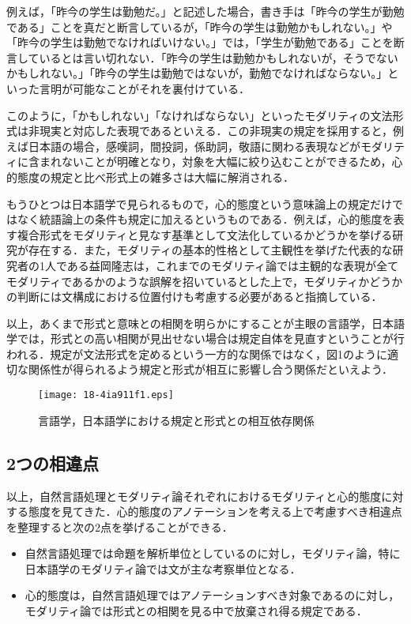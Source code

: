 \documentclass[japanese]{jnlp_1.4}
\begin{document}
例えば，「昨今の学生は勤勉だ。」と記述した場合，書き手は「昨今の学生が勤勉である」ことを真だと断言しているが，「昨今の学生は勤勉かもしれない。」や「昨今の学生は勤勉でなければいけない。」では，「学生が勤勉である」ことを断言しているとは言い切れない．「昨今の学生は勤勉かもしれないが，そうでないかもしれない。」「昨今の学生は勤勉ではないが，勤勉でなければならない。」といった言明が可能なことがそれを裏付けている．

このように，「かもしれない」「なければならない」といったモダリティの文法形式は非現実と対応した表現であるといえる．この非現実の規定を採用すると，例えば日本語の場合，感嘆詞，間投詞，係助詞，敬語に関わる表現などがモダリティに含まれないことが明確となり，対象を大幅に絞り込むことができるため，心的態度の規定と比べ形式上の雑多さは大幅に解消される．

もうひとつは日本語学で見られるもので，心的態度という意味論上の規定だけではなく統語論上の条件も規定に加えるというものである．例えば，心的態度を表す複合形式をモダリティと見なす基準として文法化しているかどうかを挙げる研究が存在する\cite{Article_05}．また，モダリティの基本的性格として主観性を挙げた代表的な研究者の1人である益岡隆志は，これまでのモダリティ論では主観的な表現が全てモダリティであるかのような誤解を招いているとした上で，モダリティかどうかの判断には文構成における位置付けも考慮する必要があると指摘している\cite{Book_08}．

以上，あくまで形式と意味との相関を明らかにすることが主眼の言語学，日本語学では，形式との高い相関が見出せない場合は規定自体を見直すということが行われる．規定が文法形式を定めるという一方的な関係ではなく，図1のように適切な関係性が得られるよう規定と形式が相互に影響し合う関係だといえよう．

\begin{figure}[t]
 \begin{center}
  \texttt{[image: 18-4ia911f1.eps]}
 \end{center}
 \caption{言語学，日本語学における規定と形式との相互依存関係}
 \label{fig:one}
\end{figure}


\subsection{2つの相違点}

以上，自然言語処理とモダリティ論それぞれにおけるモダリティと心的態度に対する態度を見てきた．心的態度のアノテーションを考える上で考慮すべき相違点を整理すると次の2点を挙げることができる．

\begin{itemize}
\item 自然言語処理では命題を解析単位としているのに対し，モダリティ論，特に日本語学のモダリティ論では文が主な考察単位となる．
\item 心的態度は，自然言語処理ではアノテーションすべき対象であるのに対し，モダリティ論では形式との相関を見る中で放棄され得る規定である．
\end{itemize}
\end{document}

